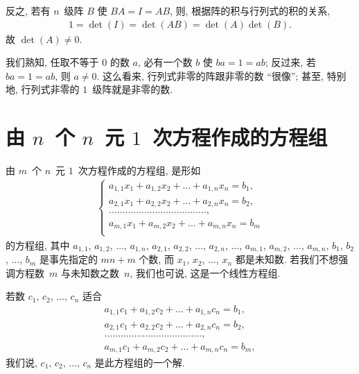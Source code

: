 \documentclass[%
    UTF8,%
    fontset=none,%
    punct=kaiming,%
    zihao=-4,%
    a4paper,%
    oneside,%
]{ctexbook}
\begin{document}
反之, 若有 \(n\)~级阵 \(B\) 使 \(BA = I = AB\),
则, 根据阵的积与行列式的积的关系,
\begin{align*}
    1 = \det {(I)} = \det {(AB)} = \det {(A)} \det {(B)}.
\end{align*}
故 \(\det {(A)} \neq 0\).

我们熟知, 任取不等于 \(0\) 的数 \(a\),
必有一个数 \(b\) 使 \(ba = 1 = ab\);
反过来, 若 \(ba = 1 = ab\), 则 \(a \neq 0\).
这么看来,
行列式非零的阵跟非零的数 ``很像'';
甚至, 特别地,
行列式非零的 \(1\)~级阵就是非零的数.

\section{\texorpdfstring{由 \(n\)~个 \(n\)~元
      \(1\)~次方程作成的方程组}%
  {由 n 个 n 元 1 次方程作成的方程组}}

由 \(m\)~个 \(n\)~元 \(1\)~次方程作成的方程组,
是形如
\begin{align*}
    \begin{cases}
        a_{1,1} x_1 + a_{1,2} x_2 + \dots + a_{1,n} x_n = b_1, \\
        a_{2,1} x_1 + a_{2,2} x_2 + \dots + a_{2,n} x_n = b_2, \\
        \dots \dots \dots \dots
        \dots \dots \dots \dots
        \dots \dots \dots \dots
        ,                                                      \\
        a_{m,1} x_1 + a_{m,2} x_2 + \dots + a_{m,n} x_n = b_m  \\
    \end{cases}
\end{align*}
的方程组,
其中
\(a_{1,1}\), \(a_{1,2}\), \(\dots\), \(a_{1,n}\),
\(a_{2,1}\), \(a_{2,2}\), \(\dots\), \(a_{2,n}\),
\(\dots\),
\(a_{m,1}\), \(a_{m,2}\), \(\dots\), \(a_{m,n}\),
\(b_1\), \(b_2\), \(\dots\), \(b_m\)
是事先指定的 \(mn + m\) 个数,
而 \(x_1\), \(x_2\), \(\dots\), \(x_n\)
都是未知数.
若我们不想强调方程数~\(m\) 与未知数之数~\(n\),
我们也可说, 这是一个线性方程组.

若数 \(c_1\), \(c_2\), \(\dots\), \(c_n\) 适合
\begin{align*}
    a_{1,1} c_1 + a_{1,2} c_2 + \dots + a_{1,n} c_n = b_1, \\
    a_{2,1} c_1 + a_{2,2} c_2 + \dots + a_{2,n} c_n = b_2, \\
    \dots \dots \dots \dots
    \dots \dots \dots \dots
    \dots \dots \dots \dots
    ,                                                      \\
    a_{m,1} c_1 + a_{m,2} c_2 + \dots + a_{m,n} c_n = b_m,
\end{align*}
我们说, \(c_1\), \(c_2\), \(\dots\), \(c_n\)
是此方程组的一个解.
\end{document}
